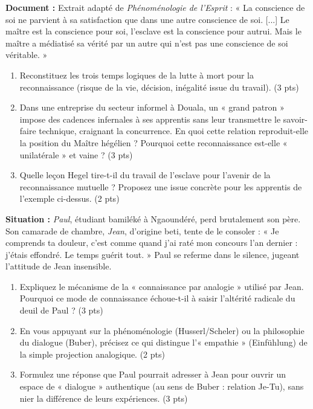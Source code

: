 \documentclass[11pt]{article}
\begin{document}
\begin{exercice}
    \textbf{Document :} Extrait adapté de \textit{Phénoménologie de l'Esprit} : « La conscience de soi ne parvient à sa satisfaction que dans une autre conscience de soi. [...] Le maître est la conscience pour soi, l'esclave est la conscience pour autrui. Mais le maître a médiatisé sa vérité par un autre qui n'est pas une conscience de soi véritable. »
    \begin{enumerate}
        \item Reconstituez les trois temps logiques de la lutte à mort pour la reconnaissance (risque de la vie, décision, inégalité issue du travail). (3 pts)
        \item Dans une entreprise du secteur informel à Douala, un « grand patron » impose des cadences infernales à ses apprentis sans leur transmettre le savoir-faire technique, craignant la concurrence. En quoi cette relation reproduit-elle la position du Maître hégélien ? Pourquoi cette reconnaissance est-elle « unilatérale » et vaine ? (3 pts)
        \item Quelle leçon Hegel tire-t-il du travail de l'esclave pour l'avenir de la reconnaissance mutuelle ? Proposez une issue concrète pour les apprentis de l'exemple ci-dessus. (2 pts)
    \end{enumerate}
\end{exercice}

\begin{exercice}
    \textbf{Situation :} \textit{Paul}, étudiant bamiléké à Ngaoundéré, perd brutalement son père. Son camarade de chambre, \textit{Jean}, d'origine beti, tente de le consoler : « Je comprends ta douleur, c'est comme quand j'ai raté mon concours l'an dernier : j'étais effondré. Le temps guérit tout. » Paul se referme dans le silence, jugeant l'attitude de Jean insensible.
    \begin{enumerate}
        \item Expliquez le mécanisme de la « connaissance par analogie » utilisé par Jean. Pourquoi ce mode de connaissance échoue-t-il à saisir l'altérité radicale du deuil de Paul ? (3 pts)
        \item En vous appuyant sur la phénoménologie (Husserl/Scheler) ou la philosophie du dialogue (Buber), précisez ce qui distingue l'« empathie » (Einfühlung) de la simple projection analogique. (2 pts)
        \item Formulez une réponse que Paul pourrait adresser à Jean pour ouvrir un espace de « dialogue » authentique (au sens de Buber : relation Je-Tu), sans nier la différence de leurs expériences. (3 pts)
    \end{enumerate}
\end{exercice}
\end{document}
